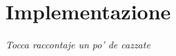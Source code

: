 \chapter{Implementazione}
\label{chap:implementazione}
\begin{minipage}{12cm}\textit{Tocca raccontaje un po' de cazzate}
\end{minipage}






